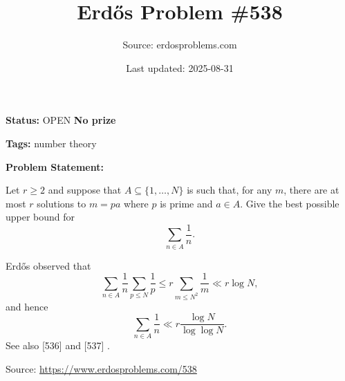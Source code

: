 \documentclass{article}
\title{Erd\H{o}s Problem \#538}
\date{Last updated: 2025-08-31}
\author{Source: erdosproblems.com}
\begin{document}
\maketitle

\noindent\textbf{Status:} OPEN \quad \textbf{No prize}

\noindent\textbf{Tags:} number theory

\medskip

\noindent\textbf{Problem Statement:}

Let $r\geq 2$ and suppose that $A\subseteq\{1,\ldots,N\}$ is such that, for any $m$, there are at most $r$ solutions to $m=pa$ where $p$ is prime and $a\in A$. Give the best possible upper bound for\[\sum_{n\in A}\frac{1}{n}.\]




Erd\H{o}s observed that\[\sum_{n\in A}\frac{1}{n}\sum_{p\leq N}\frac{1}{p}\leq r\sum_{m\leq N^2}\frac{1}{m}\ll r\log N,\]and hence\[\sum_{n\in A}\frac{1}{n} \ll r\frac{\log N}{\log\log N}.\]See also [536] and [537] .


\bigskip
\noindent\small{Source: \url{https://www.erdosproblems.com/538}}
\end{document}
